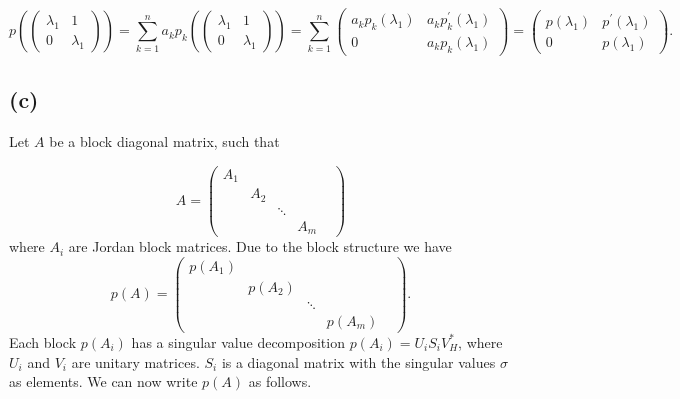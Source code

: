 \begin{equation}
  p\left(  \begin{pmatrix}
    \lambda_{1} & 1\\
    0 & \lambda_{1}
  \end{pmatrix}  \right) = \sum\limits_{k = 1}^{n} a_{k} p_{k}\left(\begin{pmatrix}
    \lambda_{1} & 1\\
    0 & \lambda_{1}
  \end{pmatrix}\right) = \sum\limits_{k = 1}^{n}\begin{pmatrix}
     a_{k}p_{k}(\lambda_{1}) &   a_{k}p_{k}^{\prime}(\lambda_{1})\\
    0 &  a_{k}p_{k}(\lambda_{1})\end{pmatrix} =
    \begin{pmatrix}
       p(\lambda_{1}) &   p^{\prime}(\lambda_{1})\\
      0 &  p(\lambda_{1})\end{pmatrix}.
\end{equation}
\subsection*{(c)}
Let $A$ be a block diagonal matrix, such that

\begin{equation}
  A = \begin{pmatrix}
    A_{1}& & & &\\
    & A_{2} & & &\\
    & & \ddots& &\\
    & & & A_{m}&
\end{pmatrix}
\end{equation}
where $A_{i}$ are Jordan block matrices. Due to the block structure we have
\begin{equation}
  p(A) = \begin{pmatrix}
    p(A_{1})& & & &\\
    & p(A_{2}) & & &\\
    & & \ddots& &\\
    & & & p(A_{m})&
\end{pmatrix}.
\end{equation}
Each block $p(A_{i})$ has a  singular value decomposition $p(A_{i}) = U_{i}S_{i} V_{H}^{\ast}$, where $U_{i}$ and $V_{i}$ are unitary matrices. $S_{i}$ is a diagonal matrix with the singular values $\sigma$ as elements. We can now write $p(A)$ as follows.

